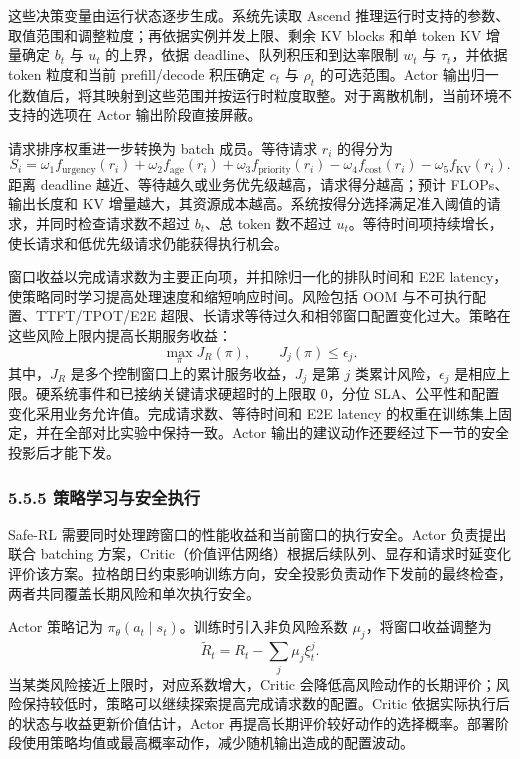 这些决策变量由运行状态逐步生成。系统先读取 Ascend 推理运行时支持的参数、取值范围和调整粒度；再依据实例并发上限、剩余 KV blocks 和单 token KV 增量确定 \(b_t\) 与 \(u_t\) 的上界，依据 deadline、队列积压和到达率限制 \(w_t\) 与 \(\tau_t\)，并依据 token 粒度和当前 prefill/decode 积压确定 \(c_t\) 与 \(\rho_t\) 的可选范围。Actor 输出归一化数值后，将其映射到这些范围并按运行时粒度取整。对于离散机制，当前环境不支持的选项在 Actor 输出阶段直接屏蔽。

请求排序权重进一步转换为 batch 成员。等待请求 \(r_i\) 的得分为
\[
S_i=\omega_1 f_{\mathrm{urgency}}(r_i)
+\omega_2 f_{\mathrm{age}}(r_i)
+\omega_3 f_{\mathrm{priority}}(r_i)
-\omega_4 f_{\mathrm{cost}}(r_i)
-\omega_5 f_{\mathrm{KV}}(r_i).
\]
距离 deadline 越近、等待越久或业务优先级越高，请求得分越高；预计 FLOPs、输出长度和 KV 增量越大，其资源成本越高。系统按得分选择满足准入阈值的请求，并同时检查请求数不超过 \(b_t\)、总 token 数不超过 \(u_t\)。等待时间项持续增长，使长请求和低优先级请求仍能获得执行机会。

窗口收益以完成请求数为主要正向项，并扣除归一化的排队时间和 E2E latency，使策略同时学习提高处理速度和缩短响应时间。风险包括 OOM 与不可执行配置、TTFT/TPOT/E2E 超限、长请求等待过久和相邻窗口配置变化过大。策略在这些风险上限内提高长期服务收益：
\[
\max_{\pi} J_R(\pi),
\qquad
J_j(\pi)\leq\epsilon_j.
\]
其中，\(J_R\) 是多个控制窗口上的累计服务收益，\(J_j\) 是第 \(j\) 类累计风险，\(\epsilon_j\) 是相应上限。硬系统事件和已接纳关键请求硬超时的上限取 0，分位 SLA、公平性和配置变化采用业务允许值。完成请求数、等待时间和 E2E latency 的权重在训练集上固定，并在全部对比实验中保持一致。Actor 输出的建议动作还要经过下一节的安全投影后才能下发。

\subsubsection*{5.5.5 策略学习与安全执行}

Safe-RL 需要同时处理跨窗口的性能收益和当前窗口的执行安全。Actor 负责提出联合 batching 方案，Critic（价值评估网络）根据后续队列、显存和请求时延变化评价该方案。拉格朗日约束影响训练方向，安全投影负责动作下发前的最终检查，两者共同覆盖长期风险和单次执行安全。

Actor 策略记为 \(\pi_{\theta}(a_t\mid s_t)\)。训练时引入非负风险系数 \(\mu_j\)，将窗口收益调整为
\[
\widetilde R_t=R_t-\sum_j\mu_j\xi_t^j.
\]
当某类风险接近上限时，对应系数增大，Critic 会降低高风险动作的长期评价；风险保持较低时，策略可以继续探索提高完成请求数的配置。Critic 依据实际执行后的状态与收益更新价值估计，Actor 再提高长期评价较好动作的选择概率。部署阶段使用策略均值或最高概率动作，减少随机输出造成的配置波动。

